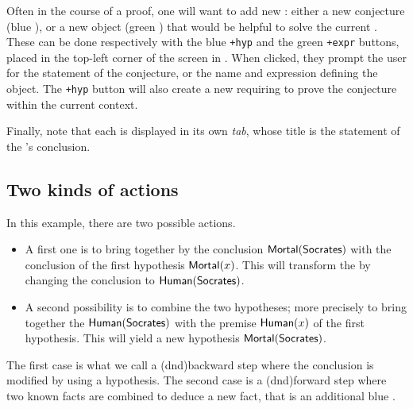 \begin{scope}
Often in the course of a proof, one will want to add new : either a
new conjecture (blue ), or a new object (green ) that would be
helpful to solve the current . These can be done respectively with the
blue \texttt{+hyp} and the green \texttt{+expr} buttons, placed in the top-left
corner of the screen in . When clicked, they prompt the user
for the statement of the conjecture, or the name and expression defining the
object. The \texttt{+hyp} button will also create a new
 requiring to prove the conjecture within the current context.

Finally, note that each  is displayed in its own \emph{tab}, whose
title is the statement of the 's conclusion.

\subsection{Two kinds of actions}

\AP
In this example, there are two possible actions.

\begin{itemize}
\item A first one is to bring together by  the conclusion
$\mbox{\textsf{Mortal}}(\mbox{\textsf{Socrates}})$ with the conclusion of the first hypothesis $\mbox{\textsf{Mortal}}(x)$.
This will transform the  by changing the conclusion to
$\mbox{\textsf{Human}}(\mbox{\textsf{Socrates}})$.
\item A second possibility is to combine the two hypotheses; more precisely to
bring together the  $\mbox{\textsf{Human}}(\mbox{\textsf{Socrates}})$ with the premise $\mbox{\textsf{Human}}(x)$ of
the first hypothesis. This will yield a new hypothesis $\mbox{\textsf{Mortal}}(\mbox{\textsf{Socrates}})$.
\end{itemize}

The first case is what we call a \intro(dnd){backward} step where the conclusion
is modified by using a hypothesis. The second case is a \intro(dnd){forward}
step where two known facts are combined to deduce a new fact, that is an
additional blue .


\end{scope}
